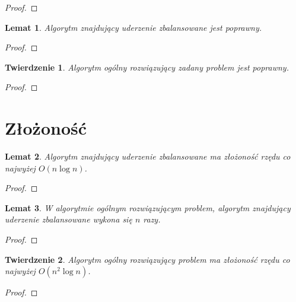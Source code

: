\documentclass[10pt,a4paper]{article}
\newtheorem{theorem}{Twierdzenie}
\newtheorem{lemma}{Lemat}
\begin{document}
	\begin{proof}
	\end{proof}

	\begin{lemma}
		Algorytm znajdujący uderzenie zbalansowane jest poprawny.
	\end{lemma}

	\begin{proof}
	\end{proof}

	\begin{theorem}
		Algorytm ogólny rozwiązujący zadany problem jest poprawny.
	\end{theorem}
	
	\begin{proof}
	\end{proof}

	
	\section{Złożoność}
	
	\begin{lemma}
		Algorytm znajdujący uderzenie zbalansowane ma złożoność rzędu co najwyżej $O(n \log n)$.
	\end{lemma}
	
	\begin{proof}
	\end{proof}
	
	\begin{lemma}
		W algorytmie ogólnym rozwiązującym problem, algorytm znajdujący uderzenie zbalansowane wykona się $n$ razy.
	\end{lemma}
	
	\begin{proof}
	\end{proof}	
	
	\begin{theorem}
		Algorytm ogólny rozwiązujący problem ma złożoność rzędu co najwyżej $O(n^{2} \log n)$.
	\end{theorem}
	
	\begin{proof}
	\end{proof}
	
	
\end{document}
